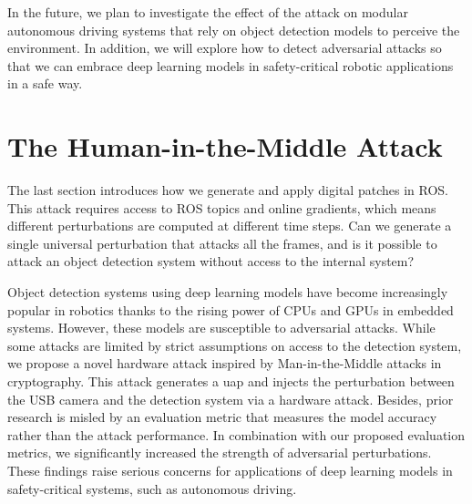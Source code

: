 In the future, we plan to investigate the effect of the attack on modular autonomous driving systems that rely on object detection models to perceive the environment. In addition, we will explore how to detect adversarial attacks so that we can embrace deep learning models in safety-critical robotic applications in a safe way.

\section{The Human-in-the-Middle Attack}

The last section introduces how we generate and apply digital patches in ROS. This attack requires access to ROS topics and online gradients, which means different perturbations are computed at different time steps. Can we generate a single universal perturbation that attacks all the frames, and is it possible to attack an object detection system without access to the internal system? 


Object detection systems using deep learning models have become increasingly popular in robotics thanks to the rising power of CPUs and GPUs in embedded systems. However, these models are susceptible to adversarial attacks. While some attacks are limited by strict assumptions on access to the detection system, we propose a novel hardware attack inspired by Man-in-the-Middle attacks in cryptography. This attack generates a \acrfull{uap} and injects the perturbation between the USB camera and the detection system via a hardware attack. Besides, prior research is misled by an evaluation metric that measures the model accuracy rather than the attack performance. In combination with our proposed evaluation metrics, we significantly increased  the strength of adversarial perturbations. These findings raise serious concerns for applications of deep learning models in safety-critical systems, such as autonomous driving.

